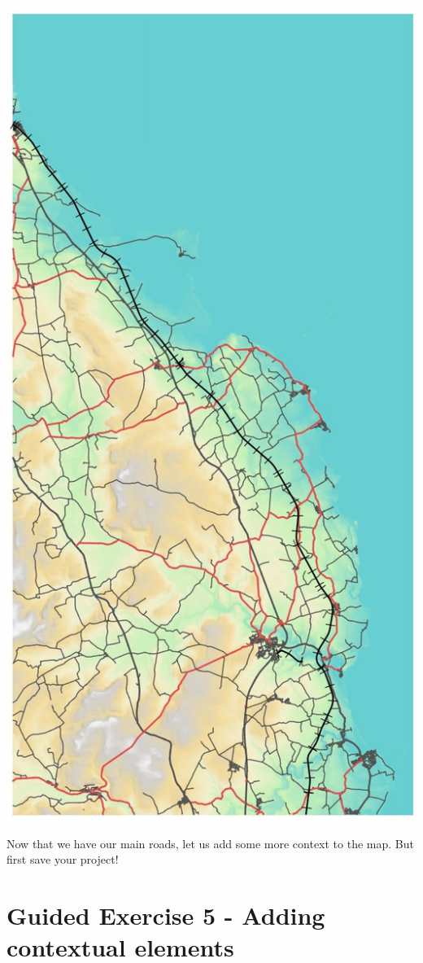 \documentclass[
  letterpaper,
  DIV=11,
  numbers=noendperiod]{scrreprt}
\begin{document}
\includegraphics{images/lab_7/lab7_fig10_demnroads.jpg}

Now that we have our main roads, let us add some more context to the
map. But first save your project!

\section{Guided Exercise 5 - Adding contextual
elements}\label{guided-exercise-5---adding-contextual-elements}
\end{document}
